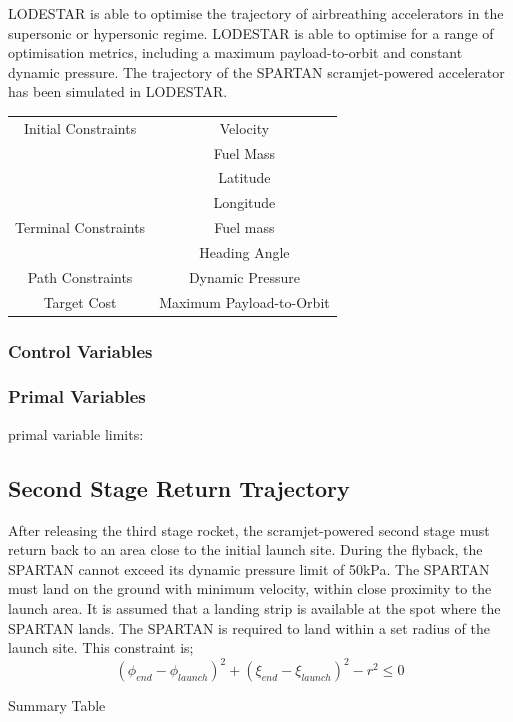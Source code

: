 LODESTAR is able to optimise the trajectory of airbreathing accelerators in the supersonic or hypersonic regime. LODESTAR is able to optimise for a range of optimisation metrics, including a maximum payload-to-orbit and constant dynamic pressure.  
The trajectory of the SPARTAN scramjet-powered accelerator has been simulated in LODESTAR. 

\begin{tabular}{|c|c|}
	\hline Initial Constraints  & Velocity \\ & Fuel Mass  \\ & Latitude \\ & Longitude \\ 
	\hline Terminal Constraints & Fuel mass \\ & Heading Angle \\ 
	\hline Path Constraints & Dynamic Pressure \\ 
	\hline Target Cost & Maximum Payload-to-Orbit \\ 
	\hline 
\end{tabular} 

\subsubsection{Control Variables}

\subsubsection{Primal Variables}
primal variable limits:

\subsection{Second Stage Return Trajectory}
After releasing the third stage rocket, the scramjet-powered second stage must return back to an area close to the initial launch site.
During the flyback, the SPARTAN cannot exceed its dynamic pressure limit of 50kPa. 
The SPARTAN must land on the ground with minimum velocity, within close proximity to the launch area. It is assumed that a landing strip is available at the spot where the SPARTAN lands. The SPARTAN is required to land within a set radius of the launch site. This constraint is;
\begin{equation}
(\phi_{end} - \phi_{launch})^2 + (\xi_{end} - \xi_{launch})^2 - r^2 \leq 0
\end{equation}



Summary Table

